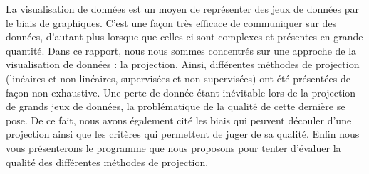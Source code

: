 
La visualisation de données est un moyen de représenter des jeux de données par le biais de graphiques.
C'est une façon très efficace de communiquer sur des données, d'autant plus lorsque que celles-ci sont complexes et présentes en grande quantité.
Dans ce rapport, nous nous sommes concentrés sur une approche de la visualisation de données : la projection. 
Ainsi, différentes méthodes de projection (linéaires et non linéaires, supervisées et non supervisées) ont été présentées de façon non exhaustive. 
Une perte de donnée étant inévitable lors de la projection de grands jeux de données, la problématique de la qualité de cette dernière se pose. 
De ce fait, nous avons également cité les biais qui peuvent découler d'une projection ainsi que les critères qui permettent de juger de sa qualité.
Enfin nous vous présenterons le programme que nous proposons pour tenter d'évaluer la qualité des différentes méthodes de projection.

